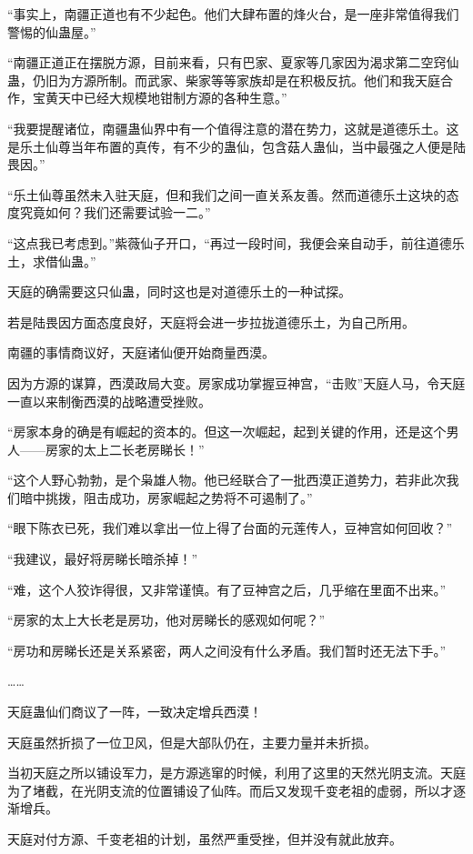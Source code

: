 \begin{this_body}
“事实上，南疆正道也有不少起色。他们大肆布置的烽火台，是一座非常值得我们警惕的仙蛊屋。”

“南疆正道正在摆脱方源，目前来看，只有巴家、夏家等几家因为渴求第二空窍仙蛊，仍旧为方源所制。而武家、柴家等等家族却是在积极反抗。他们和我天庭合作，宝黄天中已经大规模地钳制方源的各种生意。”

“我要提醒诸位，南疆蛊仙界中有一个值得注意的潜在势力，这就是道德乐土。这是乐土仙尊当年布置的真传，有不少的蛊仙，包含菇人蛊仙，当中最强之人便是陆畏因。”

“乐土仙尊虽然未入驻天庭，但和我们之间一直关系友善。然而道德乐土这块的态度究竟如何？我们还需要试验一二。”

“这点我已考虑到。”紫薇仙子开口，“再过一段时间，我便会亲自动手，前往道德乐土，求借仙蛊。”

天庭的确需要这只仙蛊，同时这也是对道德乐土的一种试探。

若是陆畏因方面态度良好，天庭将会进一步拉拢道德乐土，为自己所用。

南疆的事情商议好，天庭诸仙便开始商量西漠。

因为方源的谋算，西漠政局大变。房家成功掌握豆神宫，“击败”天庭人马，令天庭一直以来制衡西漠的战略遭受挫败。

“房家本身的确是有崛起的资本的。但这一次崛起，起到关键的作用，还是这个男人——房家的太上二长老房睇长！”

“这个人野心勃勃，是个枭雄人物。他已经联合了一批西漠正道势力，若非此次我们暗中挑拨，阻击成功，房家崛起之势将不可遏制了。”

“眼下陈衣已死，我们难以拿出一位上得了台面的元莲传人，豆神宫如何回收？”

“我建议，最好将房睇长暗杀掉！”

“难，这个人狡诈得很，又非常谨慎。有了豆神宫之后，几乎缩在里面不出来。”

“房家的太上大长老是房功，他对房睇长的感观如何呢？”

“房功和房睇长还是关系紧密，两人之间没有什么矛盾。我们暂时还无法下手。”

……

天庭蛊仙们商议了一阵，一致决定增兵西漠！

天庭虽然折损了一位卫风，但是大部队仍在，主要力量并未折损。

当初天庭之所以铺设军力，是方源逃窜的时候，利用了这里的天然光阴支流。天庭为了堵截，在光阴支流的位置铺设了仙阵。而后又发现千变老祖的虚弱，所以才逐渐增兵。

天庭对付方源、千变老祖的计划，虽然严重受挫，但并没有就此放弃。


\end{this_body}
